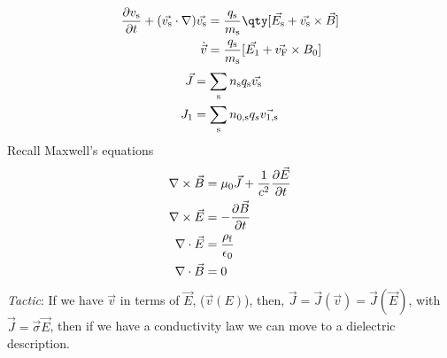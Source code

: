 \documentclass{book}         		                %
\begin{document}
\begin{subequations}
\begin{align}
\frac{\partial v_{\rm s}}{\partial t} +  (\vec{v_{\rm s}} \cdot \nabla) \vec{v_{\rm s}} &= \frac{q_{\rm s}}{m_{\rm s}} \qty[ \vec{E_{\rm s}}+ \vec{v_{\rm s}}\times \vec{B} ]  \\  
\dot{\vec{v}} &= \frac{q_{\rm s}}{m_{\rm s}} [ \vec{E_1}+\vec{v_{\rm F}}\times B_0 ] 
\end{align}
\end{subequations}
\begin{subequations}
\begin{align}
\vec{J} &= \sum_{\rm s} n_{\rm s} q_{\rm s}\vec{v_{\rm s}} \\ 
J_1 &= \sum_{\rm s} n_{0,{\rm s}} q_s \vec{v_{1, \rm s}}
\end{align}
\end{subequations}
Recall Maxwell's equations
\begin{align}
  \nabla \times \vec{B} &= \mu_0 \vec{J} + \frac{1}{c^2} \frac{\partial \vec{E}}{\partial t} \\
\nabla \times \vec{E} &= - \frac{\partial \vec{B}}{\partial t} \\
\nabla \cdot \vec{E} &= \frac{\rho_{\rm f}}{\epsilon_0} \\
\nabla \cdot \vec{B} &= 0
\end{align}
{\em Tactic}: If we have $\vec{v}$ in terms of $\vec{E}$, ($\vec{v}(E)$), then, $\vec{J} = \vec{J}(\vec{v}) = \vec{J}(\vec{E})$, with $\vec{J} = \vec{\sigma} \vec{E}$, then if we have a conductivity law we can move to a dielectric description.
\end{document}
